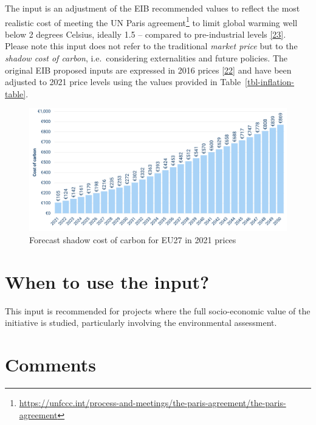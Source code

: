 \documentclass[
  11pt,
  a4paper,
]{book}
\DeclareRobustCommand{\href}[2]{#2\footnote{\url{#1}}}
\begin{document}
The input is an adjustment of the EIB recommended values to reflect the
most realistic cost of meeting the
\href{https://unfccc.int/process-and-meetings/the-paris-agreement/the-paris-agreement}{UN
Paris agreement} to limit global warming well below 2 degrees Celsius,
ideally 1.5 -- compared to pre-industrial levels
\protect\hyperlink{ref-ipcc2018}{{[}23{]}}. Please note this input does
not refer to the traditional \emph{market price} but to the \emph{shadow
cost of carbon}, i.e.~considering externalities and future policies. The
original EIB proposed inputs are expressed in 2016 prices
\protect\hyperlink{ref-eib2020}{{[}22{]}} and have been adjusted to 2021
price levels using the values provided in
Table~\ref{tbl-inflation-table}.

\begin{figure}

{\centering \includegraphics{./figures/cost_of_carbon.png}

}

\caption{\label{fig-cost-of-carbon}Forecast shadow cost of carbon for
EU27 in 2021 prices}

\end{figure}

\hypertarget{when-to-use-the-input-4}{%
\section{When to use the input?}\label{when-to-use-the-input-4}}

This input is recommended for projects where the full socio-economic
value of the initiative is studied, particularly involving the
environmental assessment.

\hypertarget{comments-2}{%
\section{Comments}\label{comments-2}}
\end{document}
